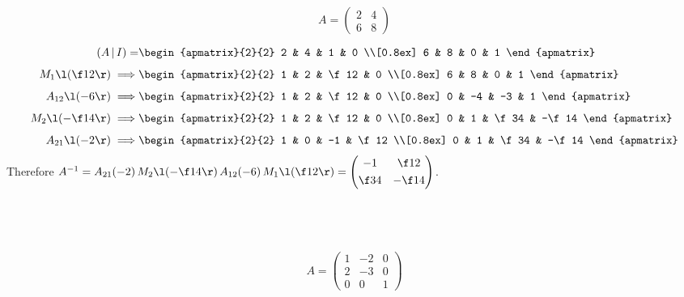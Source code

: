 \documentclass[a4paper]{article}
\begin{document}
\subsection{~} %

\begin{questionbody}
\[ A = \begin{pmatrix}2 & 4 \\ 6 & 8\end{pmatrix} \]
\end{questionbody}

\begin{align*}
(A\,|\,I) = &\begin{apmatrix}{2}{2}
    2 & 4 & 1 & 0 \\[0.8ex]
    6 & 8 & 0 & 1
\end{apmatrix} \\[1ex]
M_1\l(\f12\r) \implies &\begin{apmatrix}{2}{2}
    1 & 2 & \f12 & 0 \\[0.8ex]
    6 & 8 & 0 & 1
\end{apmatrix} \\[1ex]
A_{12} \l(-6\r) \implies &\begin{apmatrix}{2}{2}
    1 & 2 & \f12 & 0 \\[0.8ex]
    0 & -4 & -3 & 1
\end{apmatrix} \\[1ex]
M_2 \l(-\f14\r) \implies &\begin{apmatrix}{2}{2}
    1 & 2 & \f12 & 0 \\[0.8ex]
    0 & 1 & \f34 & -\f14
\end{apmatrix} \\[1ex]
A_{21} \l(-2\r) \implies &\begin{apmatrix}{2}{2}
    1 & 0 & -1 & \f12 \\[0.8ex]
    0 & 1 & \f34 & -\f14
\end{apmatrix}
\end{align*}
Therefore $A^{-1} = A_{21}(-2)\, M_2\l(-\f14\r)\, A_{12}(-6)\, M_1\l(\f12\r) = \begin{pmatrix}-1 & \f12 \\[0.8ex] \f34 & -\f14\end{pmatrix}$.

\subsection{~} %

\begin{questionbody}
\[ A = \begin{pmatrix}
1 & -2 & 0 \\
2 & -3 & 0 \\
0 & 0 & 1
\end{pmatrix} \]
\end{questionbody}
\end{document}
